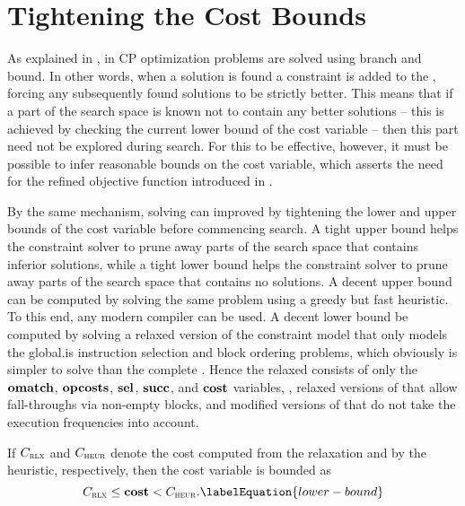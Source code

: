 \section{Tightening the Cost Bounds}

As explained in , in \gls{CP} optimization
problems are solved using \gls{branch and bound}.
%
In other words, when a \gls{solution} is found a \gls{constraint} is added to
the , forcing any subsequently found \glspl{solution}
to be strictly better.
%
This means that if a part of the \gls{search space} is known not to contain any
better \glspl{solution} -- this is achieved by checking the current lower bound
of the \gls{cost variable} -- then this part need not be explored during
\gls{search}.
%
For this to be effective, however, it must be possible to infer reasonable
bounds on the \gls{cost variable}, which asserts the need for the refined
\gls{objective function} introduced in
.

By the same mechanism, solving can improved by tightening the lower and upper
bounds of the \gls{cost variable} before commencing \gls{search}.
%
A tight upper bound helps the \gls{constraint solver} to prune away parts of the
\gls{search space} that contains inferior \glspl{solution}, while a tight lower
bound helps the \gls{constraint solver} to prune away parts of the \gls{search
  space} that contains no \glspl{solution}.
%
A decent upper bound can be computed by solving the same problem using a greedy
but fast heuristic.
%
To this end, any modern \gls{compiler} can be used.
%
A decent lower bound be computed by solving a relaxed version of the
\gls{constraint model} that only models the \gls{global.is} \gls{instruction
  selection} and \gls{block ordering} problems, which obviously is simpler to
solve than the complete .
%
Hence the relaxed  consists of only the
$\mVar{omatch}$, $\mVar{opcosts}$, $\mVar{sel}$, $\mVar{succ}$, and
$\mVar{cost}$ variables, , relaxed versions of
 that allow fall-throughs via
non-empty \glspl{block}, and modified versions of
 that
do not take the execution frequencies into account.

If $C_{\textsc{\textrm{rlx}}}$ and $C_{\textsc{\textrm{heur}}}$ denote the cost computed from the
relaxation and by the heuristic, respectively, then the \gls{cost variable} is
bounded as
%
\begin{equation}
  \mRelaxedCost \leq \mVar{cost} < \mHeuristicCost.
  \labelEquation{lower-bound}
\end{equation}


